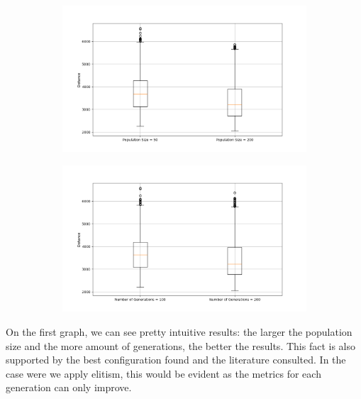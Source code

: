 \documentclass[11pt]{article}
\begin{document}
\begin{figure}[H]
    \centering
    \begin{subfigure}{0.48\textwidth}
        \includegraphics[width=\textwidth]{../results/population_size_boxplot.png}
        \label{fig:population_size}
    \end{subfigure}
    \begin{subfigure}{0.48\textwidth}
        \includegraphics[width=\textwidth]{../results/generations_boxplot.png}
        \label{fig:generations}
    \end{subfigure}
\end{figure}

On the first graph, we can see pretty intuitive results: the larger the population size and the more amount of generations, the better the results. This fact is also supported by the best configuration found and the literature consulted. In the case were we apply elitism, this would be evident as the metrics for each generation can only improve.
\end{document}
